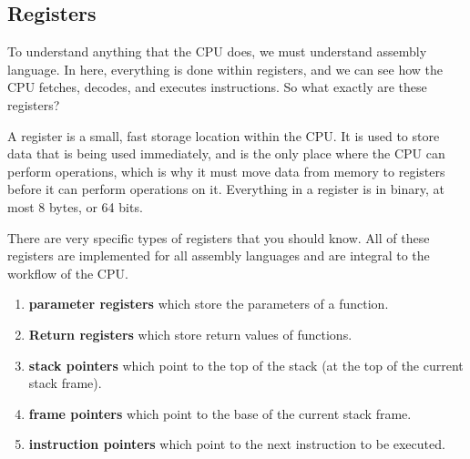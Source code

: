 \subsection{Registers}

  To understand anything that the CPU does, we must understand assembly language. In here, everything is done within registers, and we can see how the CPU fetches, decodes, and executes instructions. So what exactly are these registers? 

  \begin{definition}[Register]
    A register is a small, fast storage location within the CPU. It is used to store data that is being used immediately, and is the only place where the CPU can perform operations, which is why it must move data from memory to registers before it can perform operations on it. Everything in a register is in binary, at most 8 bytes, or 64 bits. 

    There are very specific types of registers that you should know. All of these registers are implemented for all assembly languages and are integral to the workflow of the CPU.  
    \begin{enumerate}
      \item \textbf{parameter registers} which store the parameters of a function.
      \item \textbf{Return registers} which store return values of functions. 
      \item \textbf{stack pointers} which point to the top of the stack (at the top of the current stack frame). 
      \item \textbf{frame pointers} which point to the base of the current stack frame.
      \item \textbf{instruction pointers} which point to the next instruction to be executed.
    \end{enumerate}
  \end{definition}

